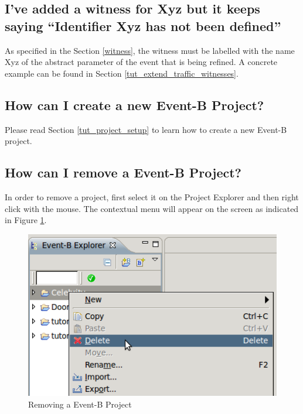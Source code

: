 \subsection{I've added a witness for \textsf{Xyz} but it keeps saying ``Identifier \textsf{Xyz} has not been defined''}

As specified in the Section \ref{witness}, the witness must be labelled with the name \textsf{Xyz} of the abstract parameter of the event that is being refined. A concrete example can be found in Section \ref{tut_extend_traffic_witnesses}.

\subsection{How can I create a new Event-B Project?}

Please read Section \ref{tut_project_setup} to learn how to create a new Event-B project.

\subsection{How can I remove a Event-B Project?}

In order to remove a project, first select it on the \textsf{Project Explorer} and then right click with the mouse. The contextual menu will appear on the screen as indicated in Figure \ref{fig_faq_removeproject}.

\begin{figure}[!ht]
\begin{center}
	\includegraphics{img/faq/faq_removeproject.png}
	\caption{Removing a Event-B Project}
	\label{fig_faq_removeproject}
\end{center}
\end{figure}

